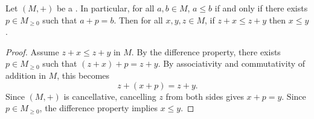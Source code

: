 \begin{lemma} \label{lemma:translation_reflects_order_in_cancellative_ordered_commutative_monoid}
    Let $(M,+)$ be a   . In particular, for all $a,b \in M$, $a \leq b$ if and only if there exists $p \in M_{\geq 0}$ such that $a + p = b$. Then for all $x,y,z \in M$, if $z + x \leq z + y$ then $x \leq y$.
\end{lemma}

\begin{proof}
    Assume $z + x \leq z + y$ in $M$. By the difference property, there exists $p \in M_{\geq 0}$ such that $(z + x) + p = z + y$. By associativity and commutativity of addition in $M$, this becomes
    $$z + (x + p) = z + y.$$
    Since $(M,+)$ is cancellative, cancelling $z$ from both sides gives $x + p = y$. Since $p \in M_{\geq 0}$, the difference property implies $x \leq y$.
\end{proof}
